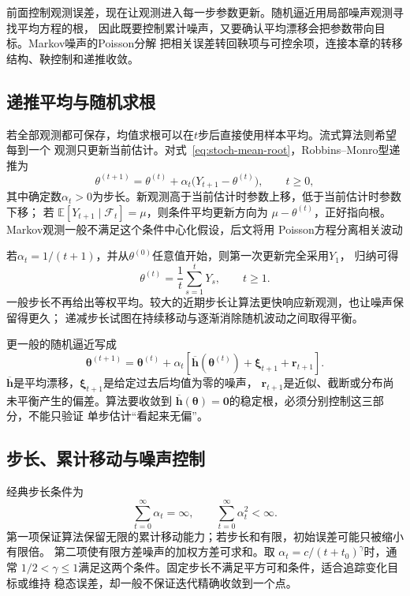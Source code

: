 前面控制观测误差，现在让观测进入每一步参数更新。随机逼近用局部噪声观测寻找平均方程的根，
因此既要控制累计噪声，又要确认平均漂移会把参数带向目标。Markov噪声的Poisson分解
把相关误差转回鞅项与可控余项，连接本章的转移结构、鞅控制和递推收敛。

\subsection{递推平均与随机求根}

若全部观测都可保存，均值求根可以在$t$步后直接使用样本平均。流式算法则希望每到一个
观测只更新当前估计。对式~\eqref{eq:stoch-mean-root}，Robbins--Monro型递推为
\begin{equation}
  \theta^{(t+1)}
  =\theta^{(t)}+\alpha_t\bigl(Y_{t+1}-\theta^{(t)}\bigr),
  \qquad t\geq0,
  \label{eq:stoch-robbins-monro-mean}
\end{equation}
其中确定数$\alpha_t>0$为步长。新观测高于当前估计时参数上移，低于当前估计时参数下移；
若
$\mathbb{E}[Y_{t+1}\mid\mathcal{F}_t]=\mu$，则条件平均更新方向为
$\mu-\theta^{(t)}$，正好指向根。Markov观测一般不满足这个条件中心化假设，后文将用
Poisson方程分离相关波动

若$\alpha_t=1/(t+1)$，并从$\theta^{(0)}$任意值开始，则第一次更新完全采用$Y_1$，
归纳可得
\[
  \theta^{(t)}
  =
  \frac1t\sum_{s=1}^{t}Y_s,
  \qquad t\geq1.
\]
一般步长不再给出等权平均。较大的近期步长让算法更快响应新观测，也让噪声保留得更久；
递减步长试图在持续移动与逐渐消除随机波动之间取得平衡。

更一般的随机逼近写成
\begin{equation}
  \bm{\theta}^{(t+1)}
  =\bm{\theta}^{(t)}+\alpha_t\left[
    \overline{\bm{h}}(\bm{\theta}^{(t)})
    +\bm{\xi}_{t+1}
    +\bm{r}_{t+1}
  \right].
  \label{eq:stoch-general-stochastic-approximation}
\end{equation}
$\overline{\bm{h}}$是平均漂移，$\bm{\xi}_{t+1}$是给定过去后均值为零的噪声，
$\bm{r}_{t+1}$是近似、截断或分布尚未平衡产生的偏差。算法要收敛到
$\overline{\bm{h}}(\bm{\theta})=\bm{0}$的稳定根，必须分别控制这三部分，不能只验证
单步估计“看起来无偏”。

\subsection{步长、累计移动与噪声控制}

经典步长条件为
\begin{equation}
  \sum_{t=0}^{\infty}\alpha_t=\infty,
  \qquad
  \sum_{t=0}^{\infty}\alpha_t^2<\infty.
  \label{eq:stoch-robbins-monro-stepsizes}
\end{equation}
第一项保证算法保留无限的累计移动能力；若步长和有限，初始误差可能只被缩小有限倍。
第二项使有限方差噪声的加权方差可求和。取
$\alpha_t=c/(t+t_0)^\gamma$时，通常
$1/2<\gamma\leq1$满足这两个条件。固定步长不满足平方可和条件，适合追踪变化目标或维持
稳态误差，却一般不保证迭代精确收敛到一个点。

